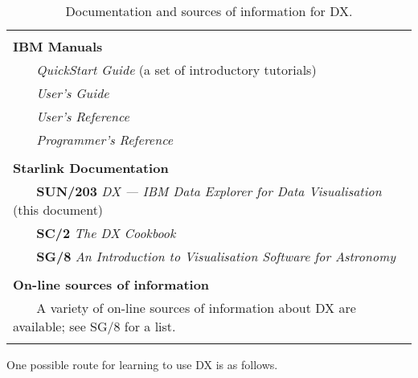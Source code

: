 \begin{table}[htbp]

\begin{center}
\begin{tabular}{|l|} \hline
   \\
{\large\bf IBM Manuals}  \\
~~~ {\it QuickStart Guide}\cite{QUICKS} (a set of introductory tutorials) \\
~~~ {\it User's Guide}\cite{USERG} \\
~~~ {\it User's Reference}\cite{USERR} \\
~~~ {\it Programmer's Reference}\cite{PROGR} \\
   \\
{\large\bf Starlink Documentation} \\
~~~ {\bf SUN/203} {\it DX --- IBM Data Explorer for Data Visualisation}\,
(this document)  \\
~~~ {\bf SC/2} {\it The DX Cookbook}\cite{SC2}  \\
~~~ {\bf SG/8} {\it An Introduction to Visualisation Software for
     Astronomy}\cite{SG8}  \\
   \\
{\large\bf On-line sources of information} \\
~~~ A variety of on-line sources of information about DX are available;
 see SG/8 for a list. \\
   \\ \hline
\end{tabular}

\caption[Documentation and sources of information for DX.]
{Documentation and sources of information for DX. \label{DOCS} }
\end{center}

\vspace{5mm}

\end{table}

One possible route for learning to use DX is as follows.

